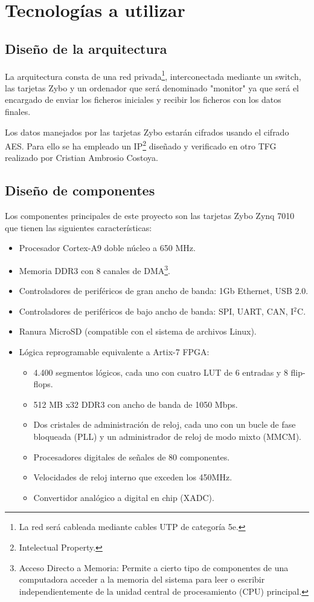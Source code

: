 \section{Tecnologías a utilizar}
\subsection{Diseño de la arquitectura}
La arquitectura consta de una red privada\footnote{La red será cableada mediante cables UTP de categoría 5e.}, interconectada mediante un switch, las tarjetas Zybo y un ordenador que será denominado "monitor" ya que será el encargado de enviar los ficheros iniciales y recibir los ficheros con los datos finales.

Los datos manejados por las tarjetas Zybo estarán cifrados usando el cifrado AES. Para ello se ha empleado un IP\footnote{Intelectual Property.} diseñado y verificado en otro TFG realizado por Cristian Ambrosio Costoya.

\subsection{Diseño de componentes}
Los componentes principales de este proyecto son las tarjetas Zybo Zynq 7010 que tienen las siguientes características:
\begin{itemize}
	\item Procesador Cortex-A9 doble núcleo a 650 MHz.
	\item Memoria DDR3 con 8 canales de DMA\footnote{Acceso Directo a Memoria: Permite a cierto tipo de componentes de una computadora acceder a la memoria del sistema para leer o escribir independientemente de la unidad central de procesamiento (CPU) principal.}.
	\item Controladores de periféricos de gran ancho de banda: 1Gb Ethernet, USB 2.0.
	\item Controladores de periféricos de bajo ancho de banda: SPI, UART, CAN, I$^2$C.
	\item Ranura MicroSD (compatible con el sistema de archivos Linux).
	\item Lógica reprogramable equivalente a Artix-7 FPGA:
	\begin{itemize}
		\item 4.400 segmentos lógicos, cada uno con cuatro LUT de 6 entradas y 8 flip-flops.
		\item 512 MB x32 DDR3 con ancho de banda de 1050 Mbps.
		\item Dos cristales de administración de reloj, cada uno con un bucle de fase bloqueada (PLL) y un administrador de reloj de modo mixto (MMCM).
		\item Procesadores digitales de señales de 80 componentes.
		\item Velocidades de reloj interno que exceden los 450MHz.
		\item Convertidor analógico a digital en chip (XADC).
	\end{itemize}
\end{itemize}

